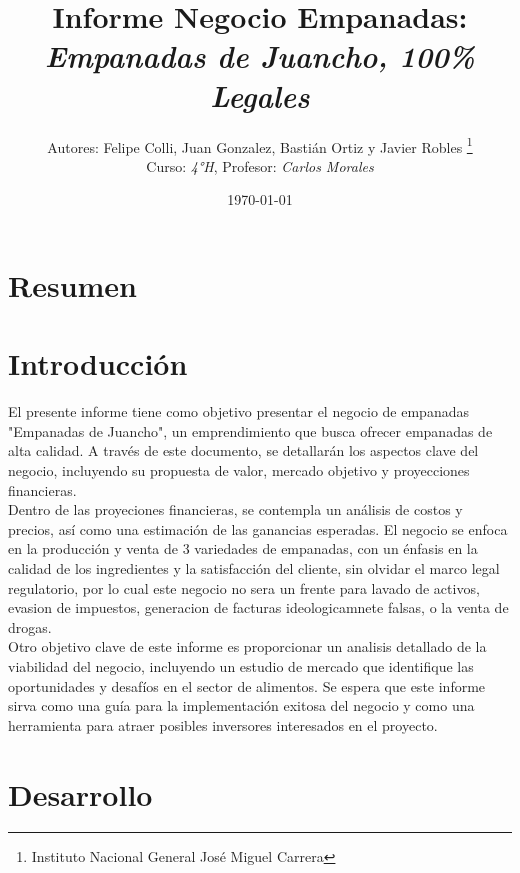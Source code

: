 \documentclass[12pt]{article}
\title{Informe Negocio Empanadas: \\
  \textit{Empanadas de Juancho, 100\% Legales}}
\author{Autores: Felipe Colli, Juan Gonzalez, Bastián Ortiz y Javier Robles \thanks{Instituto Nacional General José Miguel Carrera} \\ Curso: \textit{4°H}, Profesor: \textit{Carlos Morales}} %
\date{\today}
\begin{document}
\maketitle
\newpage

\tableofcontents
\newpage

\section{Resumen} %

\newpage



\section{Introducción} %
El presente informe tiene como objetivo presentar el negocio de empanadas "Empanadas de Juancho", un emprendimiento que busca ofrecer empanadas de alta calidad. A través de este documento, se detallarán los aspectos clave del negocio, incluyendo su propuesta de valor, mercado objetivo y proyecciones financieras. \\


Dentro de las proyeciones financieras, se contempla un análisis de costos y precios, así como una estimación de las ganancias esperadas. El negocio se enfoca en la producción y venta de 3 variedades de empanadas, con un énfasis en la calidad de los ingredientes y la satisfacción del cliente, sin olvidar el marco legal regulatorio, por lo cual este negocio no sera un frente para lavado de activos, evasion de impuestos, generacion de facturas ideologicamnete falsas, o la venta de drogas. \\ %


Otro objetivo clave de este informe es proporcionar un analisis detallado de la viabilidad del negocio, incluyendo un estudio de mercado que identifique las oportunidades y desafíos en el sector de alimentos. Se espera que este informe sirva como una guía para la implementación exitosa del negocio y como una herramienta para atraer posibles inversores interesados en el proyecto.
\newpage



\section{Desarrollo} %
\end{document}
